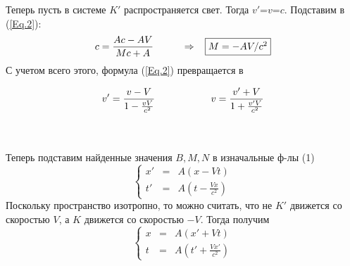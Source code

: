 Теперь пусть в системе $K'$ распространяется свет. Тогда $v'$=$v$=$c$. Под\-ста\-вим в (\ref{Eq.2}):\vspace{-4mm}
\begin{equation}
c=\frac{Ac-AV}{Mc+A}\hspace{10mm}\Rightarrow\;\;\;\fbox{$M=-AV/c^2$}
\end{equation}
С учетом всего этого, формула (\ref{Eq.2}) превращается в\\[3mm]
{\color{blue} \parbox{180mm}{
\centerline{}
\begin{displaymath}
v'=\frac{v-V}{1-\frac{vV}{c^2}}\hspace{20mm}v=\frac{v'+V}{1+\frac{v'V}{c^2}}
\end{displaymath}
}}\\
\\[5mm]
\noindent
Теперь подставим найденные значения $B,M,N$ в изначальные ф-лы (1)
\vspace{-2mm}
\begin{displaymath}
\left\{ \begin{array}{ccc}
        x'&=&A(x-Vt)\\
        t'&=&A\left(t-\frac{Vx}{c^2}\right)
        \end{array}\right.
\end{displaymath}
Поскольку пространство изотропно, то можно считать, что не $K'$ движется со скоростью $V$, а $K$ движется со скоростью $-V$. Тогда получим
\vspace{-2mm}
\begin{displaymath}
\left\{ \begin{array}{ccc}
        x&=&A(x'+Vt)\\
        t&=&A\left(t'+\frac{Vx'}{c^2}\right)
        \end{array}\right.
\end{displaymath}
\vspace{-2mm}

